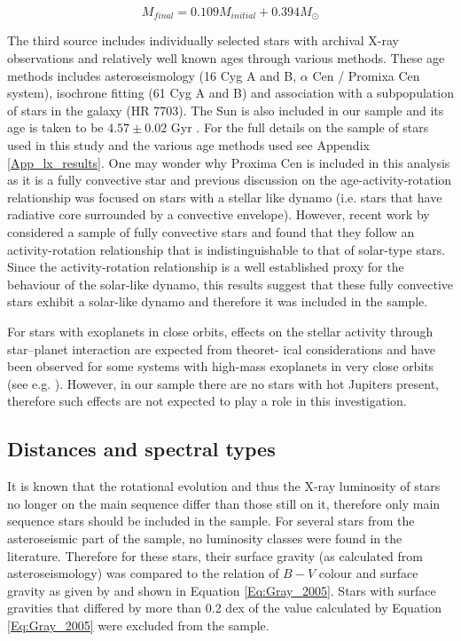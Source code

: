 \begin{equation}
    M_{final} = 0.109M_{initial} + 0.394M_{\odot}
    \label{Eq:WD_init_final_relationship}
\end{equation}

The third source includes individually selected stars with archival X-ray observations and relatively well known ages through various methods. These age methods includes asteroseismology (16 Cyg A and B, $\alpha$ Cen / Promixa Cen system), isochrone fitting (61 Cyg A and B) and association with a subpopulation of stars in the galaxy (HR 7703). The Sun is also included in our sample and its age is taken to be $4.57 \pm 0.02$ Gyr \citep{Bahcall_etal_1995}. For the full details on the sample of stars used in this study and the various age methods used see Appendix \ref{App_lx_results}. One may wonder why Proxima Cen is included in this analysis as it is a fully convective star and previous discussion on the age-activity-rotation relationship was focused on stars with a stellar like dynamo (i.e. stars that have radiative core surrounded by a convective envelope). However, recent work by \citet{Wright_Drake_2016} considered a sample of fully convective stars and found that they follow an activity-rotation relationship that is indistinguishable to that of solar-type stars. Since the activity-rotation relationship is a well established proxy for the behaviour of the solar-like dynamo, this results suggest that these fully convective stars exhibit a solar-like dynamo and therefore it was included in the sample.

For stars with exoplanets in close orbits, effects on the stellar activity through star–planet interaction are expected from theoret- ical considerations \citep{Cuntz_etal_2000} and have been observed for some systems with high-mass exoplanets in very close orbits (see e.g. \citealt{Poppenhaeger_Wolk_2014,Pillitteri_etal_2015}). However, in our sample there are no stars with hot Jupiters present, therefore such effects are not expected to play a role in this investigation.

\subsection{Distances and spectral types}
\label{Section_Xray_distances_and_spectype}
It is known that the rotational evolution and thus the X-ray luminosity of stars no longer on the main sequence differ than those still on it, therefore only main sequence stars should be included in the sample. For several stars from the asteroseismic part of the sample, no luminosity classes were found in the literature. Therefore for these stars, their surface gravity (as calculated from asteroseismology) was compared to the relation of $B-V$ colour and surface gravity as given by \citet{Gray_2005} and shown in Equation \ref{Eq:Gray_2005}. Stars with surface gravities that differed by more than 0.2 dex of the value calculated by Equation \ref{Eq:Gray_2005} were excluded from the sample.

